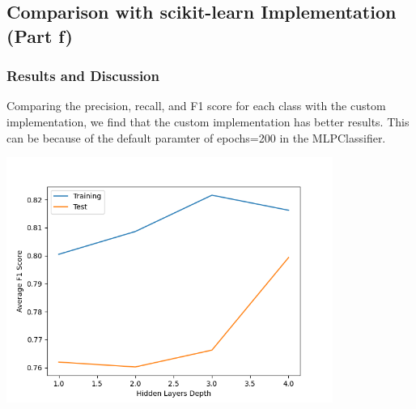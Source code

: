 \documentclass[12pt]{article}
\begin{document}
\subsection{Comparison with scikit-learn Implementation (Part f)}

\subsubsection{Results and Discussion}
Comparing the precision, recall, and F1 score for each class with the custom implementation, we find that the custom implementation has better results. This can be because of the default paramter of epochs=200 in the MLPClassifier.

\begin{center}
    \includegraphics[width=0.8\textwidth]{Assignment 3/q2/(f) f1 vs hidden_depth.png}
\end{center}
\end{document}
